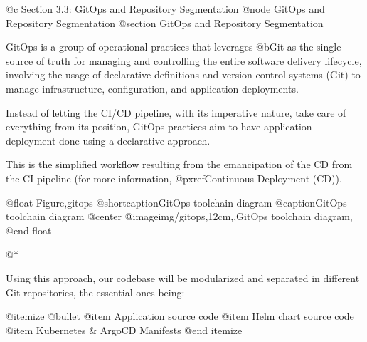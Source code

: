 @c Section 3.3: GitOps and Repository Segmentation
@node GitOps and Repository Segmentation
@section GitOps and Repository Segmentation

GitOps is a group of operational practices that leverages @b{Git as the single source of truth} for managing and controlling the entire software delivery lifecycle, involving the usage of declarative definitions and version control systems (Git) to manage infrastructure, configuration, and application deployments.

Instead of letting the CI/CD pipeline, with its imperative nature, take care of everything from its position, GitOps practices aim to have application deployment done using a declarative approach.

This is the simplified workflow resulting from the emancipation of the CD from the CI pipeline (for more information, @pxref{Continuous Deployment (CD)}).

@float Figure,gitops
@shortcaption{GitOps toolchain diagram}
@caption{GitOps toolchain diagram}
@center @image{img/gitops,12cm,,GitOps toolchain diagram,}
@end float

@*

Using this approach, our codebase will be modularized and separated in different Git repositories, the essential ones being:

@itemize @bullet
@item Application source code
@item Helm chart source code
@item Kubernetes & ArgoCD Manifests
@end itemize
